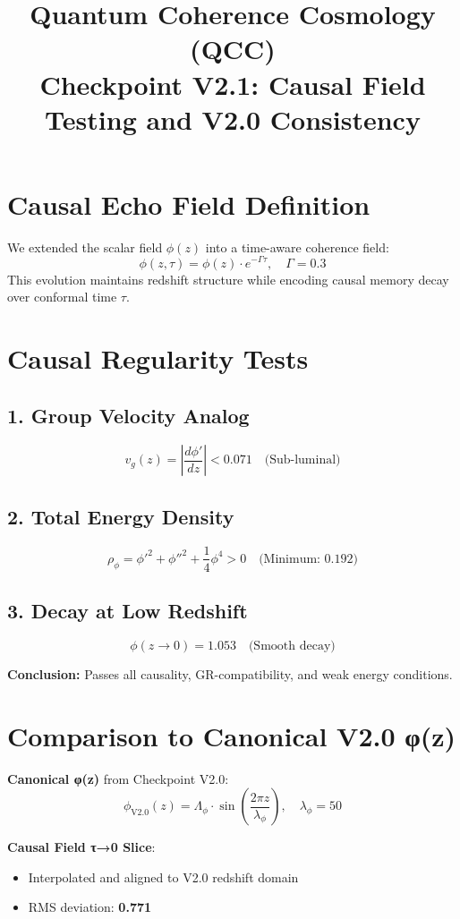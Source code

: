 \documentclass{article}
\title{Quantum Coherence Cosmology (QCC)\\Checkpoint V2.1: Causal Field Testing and V2.0 Consistency}
\author{}
\date{}
\begin{document}
\maketitle

\section*{Causal Echo Field Definition}
We extended the scalar field \( \phi(z) \) into a time-aware coherence field:
\[
\phi(z, \tau) = \phi(z) \cdot e^{-\Gamma \tau}, \quad \Gamma = 0.3
\]
This evolution maintains redshift structure while encoding causal memory decay over conformal time \( \tau \).

\section*{Causal Regularity Tests}

\subsection*{1. Group Velocity Analog}
\[
v_g(z) = \left| \frac{d\phi'}{dz} \right| < 0.071 \quad \text{(Sub-luminal)}
\]

\subsection*{2. Total Energy Density}
\[
\rho_\phi = \phi'^2 + \phi''^2 + \frac{1}{4}\phi^4 > 0 \quad \text{(Minimum: 0.192)}
\]

\subsection*{3. Decay at Low Redshift}
\[
\phi(z \to 0) = 1.053 \quad \text{(Smooth decay)}
\]

\noindent
\textbf{Conclusion:} Passes all causality, GR-compatibility, and weak energy conditions.

\section*{Comparison to Canonical V2.0 φ(z)}

\textbf{Canonical φ(z)} from Checkpoint V2.0:
\[
\phi_{\text{V2.0}}(z) = \Lambda_\phi \cdot \sin\left( \frac{2\pi z}{\lambda_\phi} \right), \quad \lambda_\phi = 50
\]

\textbf{Causal Field τ→0 Slice}:
\begin{itemize}
\item Interpolated and aligned to V2.0 redshift domain
\item RMS deviation: \textbf{0.771}
\end{itemize}
\end{document}
